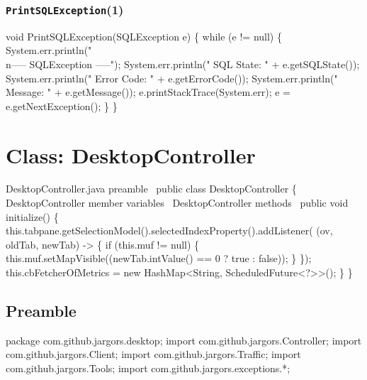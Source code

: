\subsection{\texttt{PrintSQLException}(1)}
\nwenddocs{}\endmoddef{}
void PrintSQLException(SQLException e) \{
  while (e != null) \{
    System.err.println("\\n----- SQLException -----");
    System.err.println("  SQL State:  " + e.getSQLState());
    System.err.println("  Error Code: " + e.getErrorCode());
    System.err.println("  Message:    " + e.getMessage());
    e.printStackTrace(System.err);
    e = e.getNextException();
  \}
\}
\eatline
{}\nwendcode{}\nwdocspar
\nwenddocs{}\chapter{Class: DesktopController}
\label{deskcon}

\nwenddocs{}\endmoddef{}
\LA{}DesktopController.java preamble~{\nwtagstyle{}}\RA{}
public class DesktopController \{
  \LA{}\code{}DesktopController\edoc{} member variables~{\nwtagstyle{}}\RA{}
  \LA{}\code{}DesktopController\edoc{} methods~{\nwtagstyle{}}\RA{}
  public void initialize() \{
    this.tabpane.getSelectionModel().selectedIndexProperty().addListener(
        (ov, oldTab, newTab) -> \{
      if (this.muf != null) \{
        this.muf.setMapVisible((newTab.intValue() == 0 ? true : false));
      \}
    \});
    this.cbFetcherOfMetrics = new HashMap<String, ScheduledFuture<?>>();
  \}
\}
\nwendcode{}\nwdocspar

\section{Preamble}
\nwenddocs{}\endmoddef{}
package com.github.jargors.desktop;
import com.github.jargors.Controller;
import com.github.jargors.Client;
import com.github.jargors.Traffic;
import com.github.jargors.Tools;
import com.github.jargors.exceptions.*;
\nwendcode{}\nwdocspar

